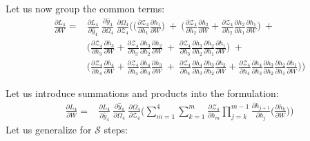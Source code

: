 \documentclass{article}
\begin{document}
Let us now group the common terms:
\begin{align*}
	\frac{\partial L_4}{ \partial{W}} = &\frac{\partial L_4}{\partial \hat{y}_4}~\frac{\partial \hat{y}_4}{\partial \Omega_4}~\frac{\partial \Omega_4}{ \partial \mathcal{Z}_4} \biggl( 
	\biggl( \frac{\partial \mathcal{Z}_4}{ \partial h_1} \frac{\partial h_1}{ \partial W} \biggl) ~+~ 
	\biggl( \frac{\partial \mathcal{Z}_4}{ \partial h_2} \frac{\partial h_2}{ \partial W} + \frac{\partial \mathcal{Z}_4}{ \partial h_2} \frac{\partial h_2}{ \partial h_1}\frac{\partial h_1}{ \partial W} \biggl)~+~\\
	& 
	 \biggl( \frac{\partial \mathcal{Z}_4}{ \partial h_3} \frac{\partial h_3}{ \partial W} + \frac{\partial \mathcal{Z}_4}{ \partial h_3} \frac{\partial h_3}{ \partial h_2}\frac{\partial h_2}{ \partial W}~+~ \frac{\partial \mathcal{Z}_4}{ \partial h_3} \frac{\partial h_3}{ \partial h_2}\frac{\partial h_2}{ \partial h_1}\frac{\partial h_1}{ \partial W} \biggl) ~+~\\
	 &
	 \biggl( \frac{\partial \mathcal{Z}_4}{ \partial h_4} \frac{\partial h_4}{ \partial W} +  \frac{\partial \mathcal{Z}_4}{ \partial h_4} \frac{\partial h_4}{ \partial h_3}\frac{\partial h_3}{ \partial W}~+~
	 \frac{\partial \mathcal{Z}_4}{ \partial h_4} \frac{\partial h_4}{ \partial h_3}\frac{\partial h_3}{ \partial h_2}\frac{\partial h_2}{ \partial W}
	+
	\frac{\partial \mathcal{Z}_4}{ \partial h_4} \frac{\partial h_4}{ \partial h_3}\frac{\partial h_3}{ \partial h_2}\frac{\partial h_2}{ \partial h_1}\frac{\partial h_1}{ \partial W} \biggl)
	\biggl)
\end{align*}

Let us introduce summations and products into the formulation:
\begin{align*}
	\frac{\partial L_4}{ \partial{W}} = &\frac{\partial L_4}{\partial \hat{y}_4}~\frac{\partial \hat{y}_4}{\partial \Omega_4}~\frac{\partial \Omega_4}{ \partial \mathcal{Z}_4} \biggl( 
	\sum_{m=1}^{4}
	\sum_{k=1}^{m} \frac{\partial \mathcal{Z}_4}{ \partial h_m} 
	\prod_{j=k}^{m-1} \frac{\partial h_{j+1}}{ \partial h_j} 
	\biggl( \frac{\partial h_k}{ \partial W} \biggl) \biggl)
\end{align*}
Let us generalize for $\mathcal{S}$ steps:
\end{document}
